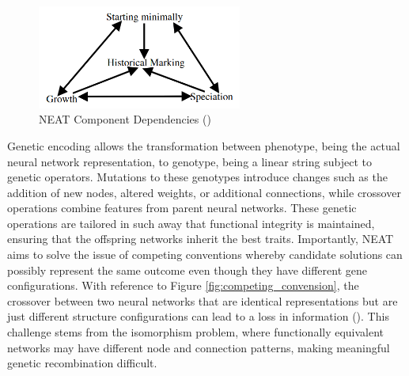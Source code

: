 \begin{figure}[H] %
	\centering %
	\includegraphics[width=0.6\textwidth]{Figures/chapter_ne/ne_neat_components.png} %
	\caption{NEAT Component Dependencies (\cite{stanley2002evolving})}
	\label{fig:neat_depedencies} %
\end{figure}

\noindent Genetic encoding allows the transformation between phenotype, being the actual neural network representation, to genotype, being a linear string subject to genetic operators. Mutations to these genotypes introduce changes such as the addition of new nodes, altered weights, or additional connections, while crossover operations combine features from parent neural networks. These genetic operations are tailored in such away that functional integrity is maintained, ensuring that the offspring networks inherit the best traits. Importantly, NEAT aims to solve the issue of competing conventions whereby candidate solutions can possibly represent the same outcome even though they have different gene configurations. With reference to Figure \ref{fig:competing_convension}, the crossover between two neural networks that are identical representations but are just different structure configurations can lead to a loss in information (\cite{stanley2002evolving}). This challenge stems from the isomorphism problem, where functionally equivalent networks may have different node and connection patterns, making meaningful genetic recombination difficult. \bigskip

